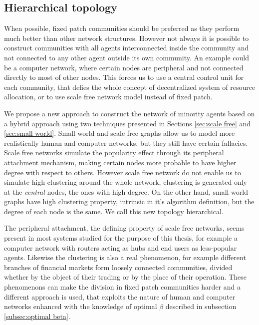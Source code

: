 \subsection{Hierarchical topology}
\label{subsec:hierarchical}

When possible, fixed patch communities should be preferred as they perform much better than other network structures.
However not always it is possible to construct communities with all agents interconnected inside the community and not connected to any other agent outside its own community.
An example could be a computer network, where certain nodes are peripheral and not connected directly to most of other nodes.
This forces us to use a central control unit for each community, that defies the whole concept of decentralized system of resource allocation, or to use scale free network model instead of fixed patch.

We propose a new approach to construct the network of minority agents based on a hybrid approach using two techniques presented in Sections \ref{sec:scale free} and \ref{sec:small world}.
Small world and scale free graphs allow us to model more realistically human and computer networks, but they still have certain fallacies.
Scale free networks simulate the popularity effect through its peripheral attachment mechanism, making certain nodes more probable to have higher degree with respect to others.
However scale free network do not enable us to simulate high clustering around the whole network, clustering is generated only at the \textit{central} nodes, the ones with high degree.
On the other hand, small world graphs have high clustering property, intrinsic in it's algorithm definition, but the degree of each node is the same.
We call this new topology hierarchical.

The peripheral attachment, the defining property of scale free networks, seems present in most systems studied for the purpose of this thesis, for example a computer network with routers acting as hubs and end users as less-popular agents.
Likewise the clustering is also a real phenomenon, for example different branches of financial markets form loosely connected communities, divided whether by the object of their trading or by the place of their operation.
These phenomenons can make the division in fixed patch communities harder and a different approach is used, that exploits the nature of human and computer networks enhanced with the knowledge of optimal $\beta$ described in subsection \ref{subsec:optimal beta}.


